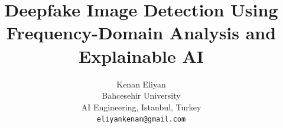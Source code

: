 \documentclass[10pt,twocolumn,letterpaper]{article}
\title{Deepfake Image Detection Using\\
       Frequency-Domain Analysis and Explainable AI}
\author{Kenan Eliyan\\
Bahcesehir University\\
AI Engineering, Istanbul, Turkey\\
{\tt\small eliyankenan@gmail.com}
}
\begin{document}
\maketitle










{
    \small
    
    
}

% 
\end{document}
